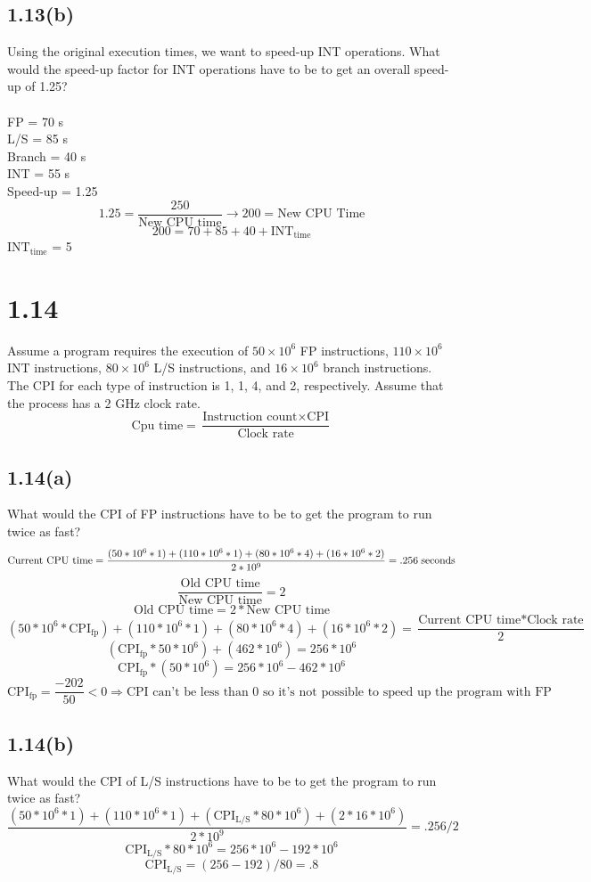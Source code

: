\documentclass[12pt]{article}
\begin{document}
\subsection*{1.13(b)}
Using the original execution times, we want to speed-up INT operations. What would the
speed-up factor for INT operations have to be to get an overall speed-up of 1.25?\\
\\
FP = 70 s\\
L/S = 85 s\\
Branch = 40 s\\
INT = 55 s \\
Speed-up = 1.25\\
\[
1.25 = \frac{250}{\text{New CPU time}} \rightarrow 200 = \text{New CPU Time}
\]
\[
200 = 70 + 85 + 40 + \text{INT}_{\text{time}}
\]
$\text{INT}_{\text{time}}$ = 5\\

\section*{1.14}
Assume a program requires the execution of $50\times10^6$ FP instructions,
$110\times10^6$ INT instructions, $80\times10^6$ L/S instructions, and 
$16\times10^6$ branch instructions.  The CPI for each type of instruction is 1, 1, 4, and 2,
respectively.  Assume that the process has a 2 GHz clock rate.
\begin{equation*}
	\text{Cpu time} = \frac{\text{Instruction count}\times{\text{CPI}}}{\text{Clock rate}}
\end{equation*}

\subsection*{1.14(a)}
What would the CPI of FP instructions have to be to get the program to run twice as fast?
\[
\text{Current CPU time} = \frac{(50*10^6*1)+(110*10^6*1)+(80*10^6*4)+(16*10^6*2)}{2*10^9} = .256\;\text{seconds}\\
\]
\[
\frac{\text{Old CPU time}}{\text{New CPU time}} = 2
\]
\[
\text{Old CPU time} = 2*\text{New CPU time}
\]
\[
(50*10^6*\text{CPI}_{\text{fp}})+(110*10^6*1)+(80*10^6*4)+(16*10^6*2) = \frac{\text{Current CPU time}*\text{Clock rate}}{2}
\]
\[
(\text{CPI}_{\text{fp}}*50*10^6) + (462*10^6) = 256*10^6
\]
\[
\text{CPI}_{\text{fp}}*(50*10^6) = 256*10^6 - 462*10^6
\]
\[
\text{CPI}_{\text{fp}} = \frac{-202}{50} < 0 \Rightarrow \text{CPI can't be less than 0 so it's not possible to speed up the program with FP alone}
\]

\subsection*{1.14(b)}
What would the CPI of L/S instructions have to be to get the program to run twice as fast?
\[
	\frac{(50*10^6*1)+(110*10^6*1)+(\text{CPI}_{\text{L/S}}*80*10^6)+(2*16*10^6)}{2*10^9} = .256/2
\]
\[
	\text{CPI}_{\text{L/S}}*80*10^6 = 256*10^6 - 192*10^6
\]
\[
	\text{CPI}_{\text{L/S}} = (256-192)/80 = .8
\]
\end{document}
